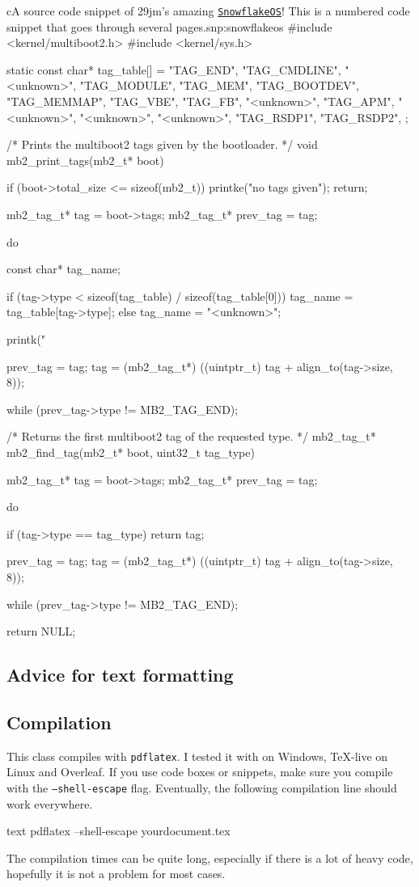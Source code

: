\documentclass[raggedright, twoside, 11pt]{tufte-style-article}
\begin{document}
\begin{snippetnum}{c}{A source code snippet of 29jm's amazing \href{https://github.com/29jm/SnowflakeOS}{\texttt{SnowflakeOS}}! This is a numbered code snippet that goes through several pages.}{snp:snowflakeos}
#include <kernel/multiboot2.h>
#include <kernel/sys.h>

static const char* tag_table[] = {
	"TAG_END",
	"TAG_CMDLINE",
	"<unknown>",
	"TAG_MODULE",
	"TAG_MEM",
	"TAG_BOOTDEV",
	"TAG_MEMMAP",
	"TAG_VBE",
	"TAG_FB",
	"<unknown>",
	"TAG_APM",
	"<unknown>",
	"<unknown>",
	"<unknown>",
	"TAG_RSDP1",
	"TAG_RSDP2",
};

/* Prints the multiboot2 tags given by the bootloader.
*/
void mb2_print_tags(mb2_t* boot) {
	if (boot->total_size <= sizeof(mb2_t)) {
		printke("no tags given");
		return;
	}
	
	mb2_tag_t* tag = boot->tags;
	mb2_tag_t* prev_tag = tag;
	
	do {
		const char* tag_name;
		
		if (tag->type < sizeof(tag_table) / sizeof(tag_table[0])) {
			tag_name = tag_table[tag->type];
		} else {
			tag_name = "<unknown>";
		}
		
		printk("%
		
		prev_tag = tag;
		tag = (mb2_tag_t*) ((uintptr_t) tag + align_to(tag->size, 8));
	} while (prev_tag->type != MB2_TAG_END);
}

/* Returns the first multiboot2 tag of the requested type.
*/
mb2_tag_t* mb2_find_tag(mb2_t* boot, uint32_t tag_type) {
	mb2_tag_t* tag = boot->tags;
	mb2_tag_t* prev_tag = tag;
	
	do {
		if (tag->type == tag_type) {
			return tag;
		}
		
		prev_tag = tag;
		tag = (mb2_tag_t*) ((uintptr_t) tag + align_to(tag->size, 8));
	} while (prev_tag->type != MB2_TAG_END);
	
	return NULL;
}
\end{snippetnum}


\subsection{Advice for text formatting}


\subsection{Compilation}

This class compiles with \texttt{pdflatex}. I tested it with  on Windows, \TeX-live on Linux and Overleaf. If you use code boxes or snippets, make sure you compile with the \texttt{--shell-escape} flag. Eventually, the following compilation line should work everywhere.
\begin{codebox}{text}
pdflatex --shell-escape yourdocument.tex
\end{codebox}
The compilation times can be quite long, especially if there is a lot of heavy code, hopefully it is not a problem for most cases.
\end{document}
